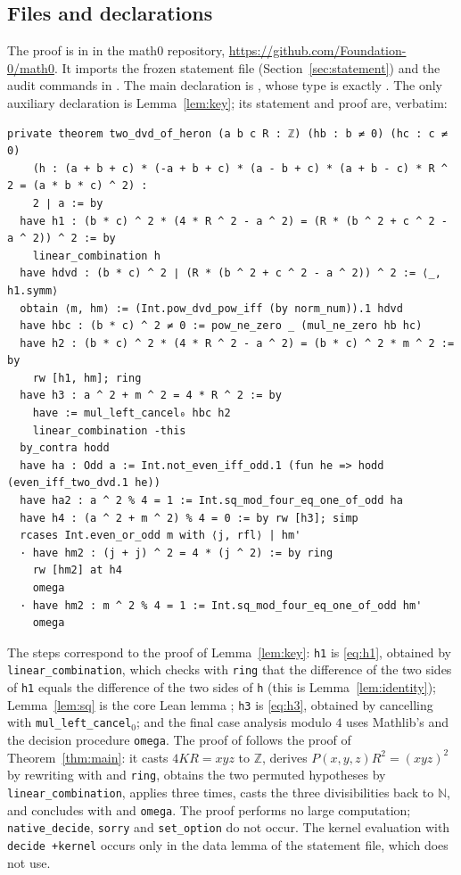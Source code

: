 \documentclass[11pt]{amsart}
\theoremstyle{plain}
\theoremstyle{definition}
\newcommand{\N}{\mathbb{N}}
\newcommand{\Z}{\mathbb{Z}}
\begin{document}
\subsection*{Files and declarations}
The proof is in  in the math0 repository, \url{https://github.com/Foundation-0/math0}. It imports the frozen statement file  (Section~\ref{sec:statement}) and the audit commands in . The main declaration is , whose type is exactly . The only auxiliary declaration is Lemma~\ref{lem:key}; its statement and proof are, verbatim:
\begin{lstlisting}
private theorem two_dvd_of_heron (a b c R : ℤ) (hb : b ≠ 0) (hc : c ≠ 0)
    (h : (a + b + c) * (-a + b + c) * (a - b + c) * (a + b - c) * R ^ 2 = (a * b * c) ^ 2) :
    2 ∣ a := by
  have h1 : (b * c) ^ 2 * (4 * R ^ 2 - a ^ 2) = (R * (b ^ 2 + c ^ 2 - a ^ 2)) ^ 2 := by
    linear_combination h
  have hdvd : (b * c) ^ 2 ∣ (R * (b ^ 2 + c ^ 2 - a ^ 2)) ^ 2 := ⟨_, h1.symm⟩
  obtain ⟨m, hm⟩ := (Int.pow_dvd_pow_iff (by norm_num)).1 hdvd
  have hbc : (b * c) ^ 2 ≠ 0 := pow_ne_zero _ (mul_ne_zero hb hc)
  have h2 : (b * c) ^ 2 * (4 * R ^ 2 - a ^ 2) = (b * c) ^ 2 * m ^ 2 := by
    rw [h1, hm]; ring
  have h3 : a ^ 2 + m ^ 2 = 4 * R ^ 2 := by
    have := mul_left_cancel₀ hbc h2
    linear_combination -this
  by_contra hodd
  have ha : Odd a := Int.not_even_iff_odd.1 (fun he => hodd (even_iff_two_dvd.1 he))
  have ha2 : a ^ 2 % 4 = 1 := Int.sq_mod_four_eq_one_of_odd ha
  have h4 : (a ^ 2 + m ^ 2) % 4 = 0 := by rw [h3]; simp
  rcases Int.even_or_odd m with ⟨j, rfl⟩ | hm'
  · have hm2 : (j + j) ^ 2 = 4 * (j ^ 2) := by ring
    rw [hm2] at h4
    omega
  · have hm2 : m ^ 2 % 4 = 1 := Int.sq_mod_four_eq_one_of_odd hm'
    omega
\end{lstlisting}
The steps correspond to the proof of Lemma~\ref{lem:key}: \texttt{h1} is \eqref{eq:h1}, obtained by \texttt{linear\_combination}, which checks with \texttt{ring} that the difference of the two sides of \texttt{h1} equals the difference of the two sides of \texttt{h} (this is Lemma~\ref{lem:identity}); Lemma~\ref{lem:sq} is the core Lean lemma ; \texttt{h3} is \eqref{eq:h3}, obtained by cancelling with \texttt{mul\_left\_cancel}$_0$; and the final case analysis modulo $4$ uses Mathlib's  and the decision procedure \texttt{omega}. The proof of  follows the proof of Theorem~\ref{thm:main}: it casts $4KR=xyz$ to $\Z$, derives $P(x,y,z)R^2=(xyz)^2$ by rewriting with  and \texttt{ring}, obtains the two permuted hypotheses by \texttt{linear\_combination}, applies  three times, casts the three divisibilities back to $\N$, and concludes with  and \texttt{omega}. The proof performs no large computation; \texttt{native\_decide}, \texttt{sorry} and \texttt{set\_option} do not occur. The kernel evaluation with \texttt{decide +kernel} occurs only in the data lemma  of the statement file, which  does not use.
\end{document}
